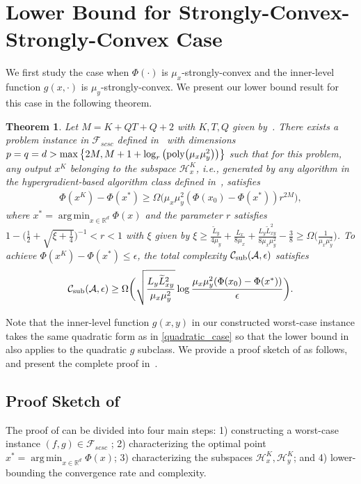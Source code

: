 \documentclass{osudissert96}
\DeclareMathOperator*{\argmin}{arg\,min}
\newtheorem{theorem}{Theorem}
\begin{document}
\section{Lower Bound for Strongly-Convex-Strongly-Convex Case}
We first study the case when $\Phi(\cdot)$ is $\mu_x$-strongly-convex and the inner-level function $g(x,\cdot)$ is $\mu_y$-strongly-convex. We present our lower bound result for this case in the following theorem.
\begin{theorem}\label{thm:low1} 
Let $M = K+QT+Q + 2$ with $K, T,Q $ given by~. 
There exists a problem instance in $\mathcal{F}_{scsc}$ defined in~ with dimensions $p=q=d> \max\big\{2M,M+1+\log_{r}\big(\mbox{\normalfont poly}\big(\mu_x\mu_y^2\big)\big)\big\}$ such that for this problem, any output $x^K$ belonging to the subspace $\mathcal{H}_x^K$, i.e., generated by any algorithm in the hypergradient-based algorithm class
defined in~, satisfies 
\begin{align}\label{result:first}
\Phi(x^K)-\Phi(x^*) \geq \Omega\Big(\mu_x\mu_y^2(\Phi(x_0)-\Phi(x^*)) r^{2M}\Big),
\end{align}
where $x^*=\argmin_{x\in\mathbb{R}^d}\Phi(x)$ and the parameter $r$ satisfies $1-\Big(\frac{1}{2}+\sqrt{\xi+\frac{1}{4}}\Big)^{-1} < r< 1$ with $\xi$ given by 
$\xi\geq \frac{\widetilde L_y}{4\mu_y} +\frac{L_x}{8\mu_x} +\frac{L_y\widetilde L_{xy}^2}{8\mu_x\mu_y^2} -\frac{3}{8}\geq \Omega \big(\frac{1}{\mu_x\mu_y^2}\big)$. 
To achieve $\Phi(x^K)-\Phi(x^*)\leq \epsilon$,  the total complexity $\mathcal{C}_{\text{\normalfont sub}}(\mathcal{A},\epsilon)$ satisfies 
\begin{align*}
\mathcal{C}_{\text{\normalfont sub}}(\mathcal{A},\epsilon) \geq \Omega\bigg(\sqrt{\frac{L_y\widetilde L_{xy}^2}{\mu_x\mu_y^2}}\log  \frac{\mu_x\mu_y^2(\Phi(x_0)-\Phi(x^*))}{\epsilon}  \bigg).
\end{align*}
\end{theorem}
Note that the inner-level function $g(x,y)$ in our constructed worst-case instance takes the same quadratic form as in \cref{quadratic_case} so that the lower bound in  also applies to the quadratic $g$ subclass. 
We provide a proof sketch of  as follows, and present the complete proof in~. 
 
\subsection*{Proof Sketch of }
The proof of    can be divided into four main steps: 1) constructing a worst-case instance $(f,g)\in\mathcal{F}_{scsc}$ ; 2) characterizing the optimal point $x^*=\argmin_{x\in\mathbb{R}^d}\Phi(x)$; 3) characterizing the subspaces $\mathcal{H}_x^K,\mathcal{H}_y^K$; and 4) lower-bounding the convergence rate and complexity. 
\end{document}
